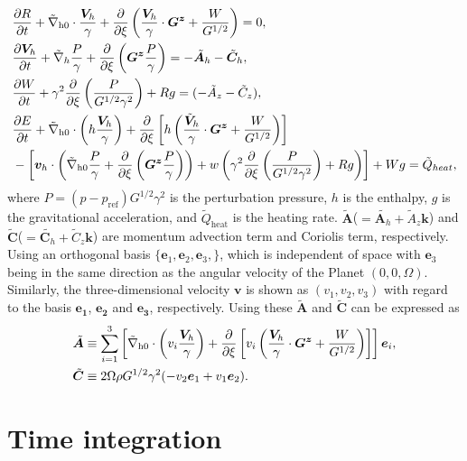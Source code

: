 \begin{align}
 & \DP{R}{t} + \tilde{\nabla}_\text{h0}\cdot\frac{\bm{V}_h}{\gamma} +
 \DP{}{\xi} \left(\frac{\bm{V}_h}{\gamma}\cdot\bm{G^z} + \frac{W}{G^{1/2}}
 \right) = 0,%
 \\
 & \DP{\bm{V}_h}{t} + \tilde{\nabla}_h \frac{P}{\gamma} +
 \DP{}{\xi}\left(\bm{G^z}\frac{P}{\gamma}\right)
 = -\tilde{\bm{A}}_h - \tilde{\bm{C}}_h,%
 \\
 & \DP{W}{t} + \gamma^2 \DP{}{\xi}\left(\frac{P}{G^{1/2}\gamma^2}\right)
 + Rg = (-\tilde{A}_z -\tilde{C}_z ),%
 \\
 & \DP{E}{t} + \tilde{\nabla}_\text{h0} \cdot
 \left(h\frac{\bm{V}_h}{\gamma}\right)
 + \DP{}{\xi}\left[h\left(\frac{\tilde{\bm{V}}_h}{\gamma}\cdot\bm{G^z} + \frac{W}{G^{1/2}}
\right)
 \right]\nonumber\\
& -\left[\bm{v}_h \cdot \left(\tilde{\nabla}_\text{h0}\frac{P}{\gamma} + \DP{}{\xi}\left(\bm{G^z}\frac{P}{\gamma}
\right)
\right)
+ w \left(\gamma^2 \DP{}{\xi}\left(\frac{P}{G^{1/2}\gamma^2}
\right)
+Rg
\right)
\right] + Wg = \tilde{Q}_{heat},
\end{align}
%
where $P = (p-p_\text{ref})G^{1/2}\gamma^2$ is the perturbation
pressure,
$h$ is the enthalpy,
$g$ is the gravitational acceleration,
and $\tilde{Q}_\text{heat}$ is the heating rate.
%
$\tilde{\bm{A}}$($=\tilde{\bm{A}_h}+\tilde{A}_z\bm{k}$) and
$\tilde{\bm{C}}$($=\tilde{\bm{C}_h}+\tilde{C}_z\bm{k}$) are
momentum advection term and Coriolis term, respectively.
%
Using an orthogonal basis $\{\bm{e}_1,\bm{e}_2,\bm{e}_3,\}$,
which is independent of space with $\bm{e}_3$ being in the same
direction as the angular velocity of the Planet $(0,0,\Omega)$.
%
Similarly, the three-dimensional velocity $\bm{v}$ is shown as
$(v_1, v_2, v_3)$ with regard to the basis $\bm{e_1}$, $\bm{e_2}$ and
$\bm{e_3}$, respectively.
%
Using these $\tilde{\bm{A}}$ and $\tilde{\bm{C}}$ can be expressed as
%
\begin{align}
 \tilde{\bm{A}} &\equiv \sum^3_{i=1} \left[\tilde{\nabla}_\text{h0}\cdot\left(v_i\frac{\bm{V}_h}{\gamma}\right)
+\frac{\partial }{\partial \xi}\left[v_i\left(\frac{\bm{V}_h}{\gamma}\cdot\bm{G^z} + \frac{W}{G^{1/2}}
\right)
\right]
 \right]\bm{e}_i,
\\
 \tilde{\bm{C}} &\equiv 2\Omega\rho G^{1/2}\gamma^2( -v_2\bm{e}_1 +v_1\bm{e}_2 ).
\end{align}

\section{Time integration}\label{s:time_integration}

